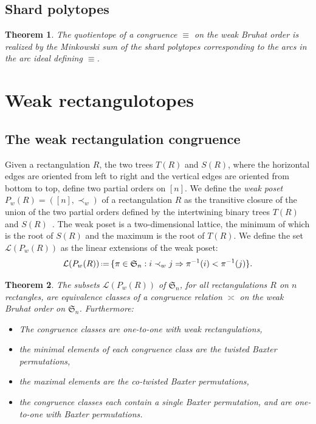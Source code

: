 \documentclass{amsart}
\newtheorem{theorem}{Theorem}%
\theoremstyle{definition}
\newcommand{\f}[1]{\mathfrak{#1}} %
\newcommand{\eqdef}{\mbox{\,\raisebox{0.2ex}{\scriptsize\ensuremath{\mathrm:}}\ensuremath{=}\,}} %
\renewcommand{\implies}{\Rightarrow} %
\newcommand{\darkblue}{\color{darkblue}} %
\newcommand{\defn}[1]{\textsl{\darkblue #1}} %
\newcommand{\baxtereq}{\asymp}%
\begin{document}
\subsection{Shard polytopes}

\begin{theorem}
  The quotientope of a congruence $\equiv$ on the weak Bruhat order is realized by the Minkowski sum of the shard polytopes corresponding to the arcs in the arc ideal defining $\equiv$.
\end{theorem}


\section{Weak rectangulotopes}
\label{sec:wr}

\subsection{The weak rectangulation congruence}

Given a rectangulation $R$, the two trees $T(R)$ and $S(R)$, where the horizontal edges are oriented from left to right and the vertical edges are oriented from bottom to top,
define two partial orders on $[n]$.
We define the \defn{weak poset} $P_w(R)=([n],\prec_w)$ of a rectangulation $R$ as the transitive closure of the union of the two partial orders defined by the intertwining binary trees $T(R)$ and $S(R)$~\cite{MR4014603}. The weak poset is a two-dimensional lattice, the minimum of which is the root of $S(R)$ and the maximum is the root of $T(R)$.
We define the set $\mathcal{L}(P_w(R))$ as the linear extensions of the weak poset:
\[
\mathcal{L}(P_w(R)) \eqdef \{\pi\in\f{S}_n : i\prec_w j\implies \pi^{-1}(i) < \pi^{-1}(j)\}.
\]

\begin{theorem}
  The subsets $\mathcal{L}(P_w(R))$ of $\f{S}_n$, for all rectangulations $R$ on $n$ rectangles, 
  are equivalence classes of a congruence relation $\baxtereq$ on the weak Bruhat order on $\f{S}_n$.
  Furthermore:
  \begin{itemize}
  \item The congruence classes are one-to-one with weak rectangulations,  
  \item the minimal elements of each congruence class are the twisted Baxter permutations,
  \item the maximal elements are the co-twisted Baxter permutations,
  \item the congruence classes each contain a single Baxter permutation, and are one-to-one with Baxter permutations.
  \end{itemize}
\end{theorem}
\end{document}
